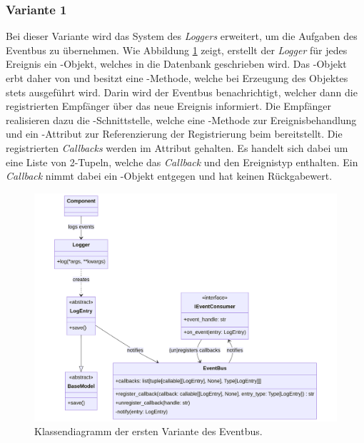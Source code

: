 \subsubsection*{Variante 1}

Bei dieser Variante wird das System des \emph{Loggers} erweitert, um die Aufgaben des Eventbus zu übernehmen. Wie Abbildung \ref{fig:eventbus-v1-class} zeigt, erstellt der \emph{Logger} für jedes Ereignis ein -Objekt, welches in die Datenbank geschrieben wird. Das -Objekt erbt daher von  und besitzt eine -Methode, welche bei Erzeugung des Objektes stets ausgeführt wird. Darin wird der Eventbus benachrichtigt, welcher dann die registrierten Empfänger über das neue Ereignis informiert. Die Empfänger realisieren dazu die -Schnittstelle, welche eine -Methode zur Ereignisbehandlung und ein -Attribut zur Referenzierung der Registrierung beim  bereitstellt. Die registrierten \emph{Callbacks} werden im Attribut  gehalten. Es handelt sich dabei um eine Liste von 2-Tupeln, welche das \emph{Callback} und den Ereignistyp enthalten. Ein \emph{Callback} nimmt dabei ein -Objekt entgegen und hat keinen Rückgabewert.

\begin{figure}[H]
	\centering
	\includegraphics[width=1.0\linewidth]{images/diagrams/eventbus-v1-class.png}
	\caption{Klassendiagramm der ersten Variante des Eventbus.}
	\label{fig:eventbus-v1-class}
\end{figure}

